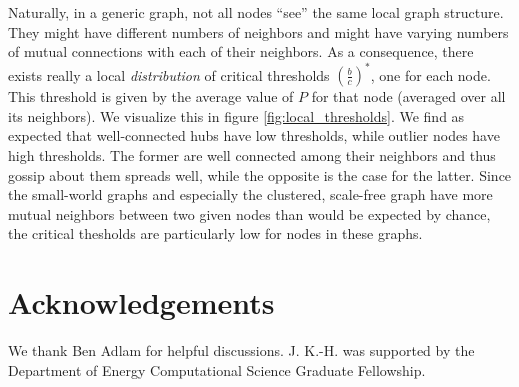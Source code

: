 \documentclass{article}
\renewcommand{\=}[1]{\stackrel{#1}{=}} %
\begin{document}
Naturally, in a generic graph, not all nodes ``see'' the same local graph structure. They might have different numbers of neighbors and might have varying numbers of mutual connections with each of their neighbors. As a consequence, there exists really a local \emph{distribution} of critical thresholds $\left( \frac{b}{c} \right)^*$, one for each node. This threshold is given by the average value of $P$ for that node (averaged over all its neighbors). We visualize this in figure \ref{fig:local_thresholds}. We find as expected that well-connected hubs have low thresholds, while outlier nodes have high thresholds. The former are well connected among their neighbors and thus gossip about them spreads well, while the opposite is the case for the latter. Since the small-world graphs and especially the clustered, scale-free graph have more mutual neighbors between two given nodes than would be expected by chance, the critical thesholds are particularly low for nodes in these graphs.

\section*{Acknowledgements}


    We thank Ben Adlam for helpful discussions. J. K.-H. was supported by the Department of Energy Computational Science Graduate Fellowship.




\newpage
\end{document}
